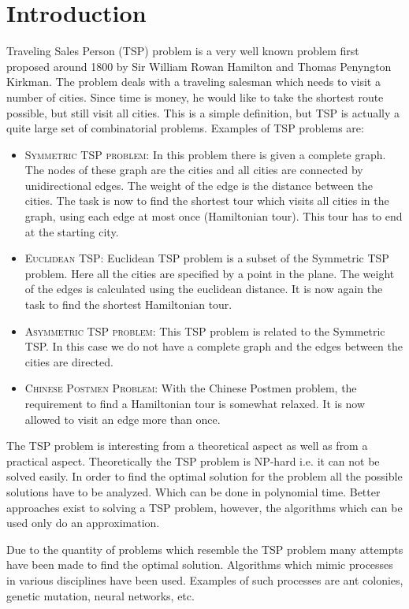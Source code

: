 \section{Introduction}
 Traveling Sales Person (TSP) problem\cite{lcns1994} is a very well known
problem first proposed around 1800 by Sir William Rowan Hamilton and Thomas
Penyngton Kirkman. The problem deals with a traveling salesman which needs to
visit a number of cities. Since time is money, he would like to take the
shortest route possible, but still visit all cities. This is a simple
definition, but TSP is actually a quite large set of combinatorial problems.
Examples of TSP problems are:
\begin{itemize}
\item \textsc{Symmetric TSP problem:}  In this problem there is given a complete graph.
The nodes of these graph are the cities and all cities are connected by
unidirectional edges. The weight of the edge is the distance between the cities.
The task is now to find the shortest tour which visits all cities in the graph,
using each edge at most once (Hamiltonian tour). This tour has to end at the
starting city.
\item \textsc{Euclidean TSP:}  Euclidean TSP problem is a subset of the
Symmetric TSP problem.  Here all the cities are specified by a point in the
plane. The weight of the edges is calculated using the euclidean distance. It
is now again the task to find the shortest Hamiltonian tour.
\item \textsc{Asymmetric TSP problem:} This TSP problem is related to the
Symmetric TSP. In this case we do not have a complete graph and the edges
between the cities are directed.
\item \textsc{Chinese Postmen Problem:} With the Chinese Postmen problem,  the
requirement to find a Hamiltonian tour is somewhat relaxed. It is now allowed
to visit an edge more than once.
\end{itemize}

The TSP problem is interesting from a theoretical aspect as well as from a
practical aspect. Theoretically the TSP problem is NP-hard i.e. it can not be
solved easily. In order to find the optimal solution for the problem all the
possible solutions have to be analyzed. Which can be done in polynomial time.
Better approaches exist to solving a TSP problem, however, the algorithms
which can be used only do an approximation.

Due to the quantity of problems which resemble the TSP problem many attempts
have been made to find the optimal solution. Algorithms which mimic processes
in various disciplines have been used. Examples of such processes are ant
colonies, genetic mutation, neural networks, etc. 

